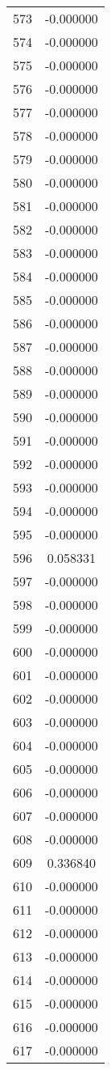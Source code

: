 \documentclass[12pt]{article}
\begin{document}
\begin{longtable}{@{}cc@{}}
573 & -0.000000 \\
574 & -0.000000 \\
575 & -0.000000 \\
576 & -0.000000 \\
577 & -0.000000 \\
578 & -0.000000 \\
579 & -0.000000 \\
580 & -0.000000 \\
581 & -0.000000 \\
582 & -0.000000 \\
583 & -0.000000 \\
584 & -0.000000 \\
585 & -0.000000 \\
586 & -0.000000 \\
587 & -0.000000 \\
588 & -0.000000 \\
589 & -0.000000 \\
590 & -0.000000 \\
591 & -0.000000 \\
592 & -0.000000 \\
593 & -0.000000 \\
594 & -0.000000 \\
595 & -0.000000 \\
596 & 0.058331 \\
597 & -0.000000 \\
598 & -0.000000 \\
599 & -0.000000 \\
600 & -0.000000 \\
601 & -0.000000 \\
602 & -0.000000 \\
603 & -0.000000 \\
604 & -0.000000 \\
605 & -0.000000 \\
606 & -0.000000 \\
607 & -0.000000 \\
608 & -0.000000 \\
609 & 0.336840 \\
610 & -0.000000 \\
611 & -0.000000 \\
612 & -0.000000 \\
613 & -0.000000 \\
614 & -0.000000 \\
615 & -0.000000 \\
616 & -0.000000 \\
617 & -0.000000 \\

\end{longtable}
\end{document}
